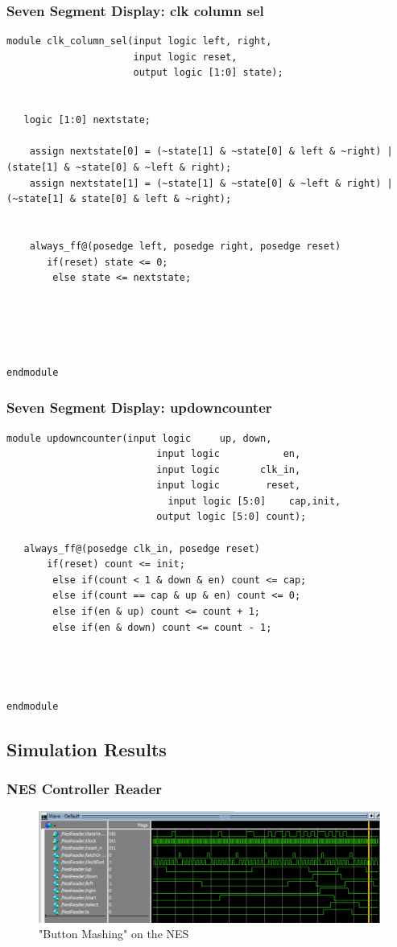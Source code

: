 \documentclass[a4paper]{article}
\begin{document}
\subsubsection{Seven Segment Display: clk column sel}
\begin{Verbatim}
module clk_column_sel(input logic left, right,
                      input logic reset,
                      output logic [1:0] state);
							 
							 
   logic [1:0] nextstate;
	
	assign nextstate[0] = (~state[1] & ~state[0] & left & ~right) | (state[1] & ~state[0] & ~left & right);
	assign nextstate[1] = (~state[1] & ~state[0] & ~left & right) | (~state[1] & state[0] & left & ~right);
	
	
	always_ff@(posedge left, posedge right, posedge reset)
	   if(reset) state <= 0;
		else state <= nextstate;
	   

   


endmodule 
\end{Verbatim}

\subsubsection{Seven Segment Display: updowncounter}
\begin{Verbatim}
module updowncounter(input logic     up, down,
					      input logic           en,
					      input logic       clk_in,
					      input logic        reset,
							input logic [5:0]    cap,init,
					      output logic [5:0] count);
							
   always_ff@(posedge clk_in, posedge reset)
	   if(reset) count <= init;
		else if(count < 1 & down & en) count <= cap;
		else if(count == cap & up & en) count <= 0;
		else if(en & up) count <= count + 1;
		else if(en & down) count <= count - 1;
						 
   
	

endmodule 
\end{Verbatim}

\subsection{Simulation Results}%

\subsubsection{NES Controller Reader}
\begin{figure}[H]
    \includegraphics[width=0.8 \linewidth]{images/NESSIM.png}
    \caption{"Button Mashing" on the NES}
    \label{nesButtonMash}
\end{figure}
\end{document}
